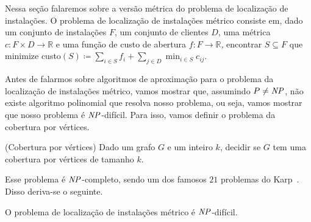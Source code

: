 Nessa seção falaremos sobre a versão métrica do problema de localização de instalações. 
O problema de localização de instalações métrico consiste em, dado um conjunto de instalações $F$, um conjunto de clientes $D$, uma métrica $c : F \times D \rightarrow \mathbb{R}$ e uma função de custo de abertura $f: F \rightarrow \mathbb{R}$, encontrar $S \subseteq F$ que minimize custo${(S) \coloneqq \sum_{i \in S} f_i +  \sum_{j \in D} \min_{i \in S} c_{ij}}$.

Antes de falarmos sobre algoritmos de aproximação para o problema da localização de instalações métrico, vamos mostrar que, assumindo $P\neq\mathit{NP}$, não existe algoritmo polinomial que resolva nosso problema, ou seja, vamos mostrar que nosso problema é $\mathit{NP}$-difícil. Para isso, vamos definir o problema da cobertura por vértices.



\begin{problem}(Cobertura por vértices)
    Dado um grafo $G$ e um inteiro $k$, decidir se $G$ tem uma cobertura por vértices de tamanho $k$.
\end{problem}
Esse problema é $\mathit{NP}$-completo, sendo um dos famosos $21$ problemas do Karp~\cite{Karp1972}. Disso deriva-se o seguinte.

\begin{theorem}
    O problema de localização de instalações métrico é $\mathit{NP}$-difícil.
\end{theorem}

